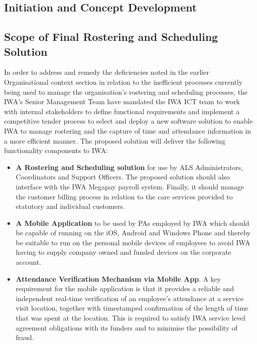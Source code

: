 \documentclass[a4paper,Times New Roman 11pt]{article}
\begin{document}
\begin{samepage}
\begin{samepage}
\end{samepage}
\begin{samepage}
\newpage
\section {Initiation and Concept Development}

\subsection {Scope of Final Rostering and Scheduling Solution}
In order to address and remedy the deficiencies noted in the earlier Organisational context section in relation to the inefficient processes currently being used to manage the organisation's rostering and scheduling processes,  the IWA's Senior Management Team have mandated the IWA ICT team to work with internal stakeholders to define functional requirements and implement a competitive tender process to select and deploy a new software solution to enable IWA to manage rostering and the capture of time and attendance information in a more efficient manner.
The proposed solution will deliver the following functionality components to IWA:
\begin{itemize}
\item \textbf{A Rostering and Scheduling solution} for use by ALS Administrators, Coordinators and Support Officers. The proposed solution should also interface with the IWA Megapay payroll system. Finally, it should manage the customer billing process in relation to the care services provided to statutory and individual customers.
\item \textbf {A Mobile Application} to be used by PAs employed by IWA which should be capable of running on the iOS, Android and Windows Phone and thereby be suitable to run on the personal mobile devices of employees to avoid IWA having to supply company owned and funded devices on the corporate account. 
\item \textbf {Attendance Verification Mechanism via Mobile App}. A key requirement for the mobile application is that it provides a reliable and independent real-time verification of an employee’s attendance at a service visit location, together with timestamped confirmation of the length of time that was spent at the location.  This is required to satisfy IWA service level agreement obligations with its funders and to minimise the possibility of fraud.

\end{itemize}
\end{samepage}
\end{samepage}
\end{document}
